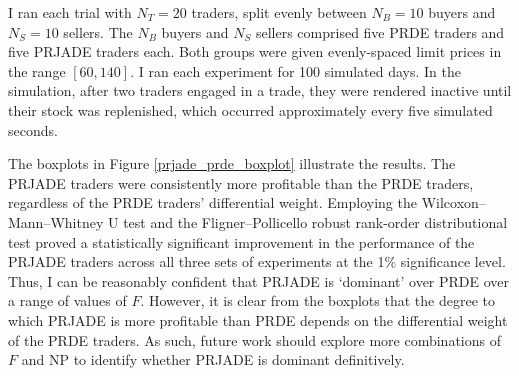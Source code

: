 \documentclass[a4paper,twoside]{article}
\begin{document}
I ran each trial with $N_T=20$ traders, split evenly between $N_B=10$ buyers and $N_S=10$ sellers.
The $N_B$ buyers and $N_S$ sellers comprised five PRDE traders and five PRJADE traders each.
Both groups were given evenly-spaced limit prices in the range $[60,140]$.
I ran each experiment for 100 simulated days.
In the simulation, after two traders engaged in a trade, they were rendered inactive until their stock was replenished, which occurred approximately every five simulated seconds.

The boxplots in Figure \ref{prjade_prde_boxplot} illustrate the results.
The PRJADE traders were consistently more profitable than the PRDE traders, regardless of the PRDE traders' differential weight.
Employing the Wilcoxon--Mann--Whitney U test and the Fligner--Pollicello robust rank-order distributional test proved a statistically significant improvement in the performance of the PRJADE traders across all three sets of experiments at the 1\% significance level.
Thus, I can be reasonably confident that PRJADE is `dominant' over PRDE over a range of values of $F$.
However, it is clear from the boxplots that the degree to which PRJADE is more profitable than PRDE depends on the differential weight of the PRDE traders.
As such, future work should explore more combinations of $F$ and $\mathrm{NP}$ to identify whether PRJADE is dominant definitively.
\end{document}
